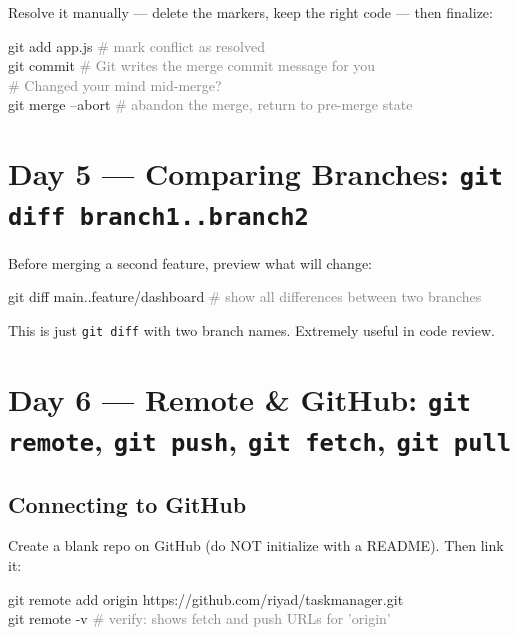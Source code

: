 \documentclass[10pt,a4paper]{article}
\newenvironment{codebox}{%
  \begin{mdframed}[backgroundcolor=codebg, linewidth=0pt,
    innerleftmargin=6pt, innerrightmargin=6pt,
    innertopmargin=4pt, innerbottommargin=4pt]%
  \small\ttfamily
}{%
  \end{mdframed}%
}
\newcommand{\cmd}[1]{\texttt{\small #1}}
\begin{document}
Resolve it manually --- delete the markers, keep the right code ---
then finalize:

\begin{codebox}
git add app.js              \textcolor{gray}{\# mark conflict as resolved}\\
git commit                  \textcolor{gray}{\# Git writes the merge commit message for you}\\
\textcolor{gray}{\# Changed your mind mid-merge?}\\
git merge --abort           \textcolor{gray}{\# abandon the merge, return to pre-merge state}
\end{codebox}

\section{Day 5 --- Comparing Branches: \texttt{git diff branch1..branch2}}

Before merging a second feature, preview what will change:

\begin{codebox}
git diff main..feature/dashboard    \textcolor{gray}{\# show all differences between two branches}
\end{codebox}

This is just \cmd{git diff} with two branch names. Extremely useful in code review.

\section{Day 6 --- Remote \& GitHub: \texttt{git remote}, \texttt{git push}, \texttt{git fetch}, \texttt{git pull}}

\subsection{Connecting to GitHub}

Create a blank repo on GitHub (do NOT initialize with a README). Then link it:

\begin{codebox}
git remote add origin https://github.com/riyad/taskmanager.git\\
git remote -v           \textcolor{gray}{\# verify: shows fetch and push URLs for 'origin'}
\end{codebox}
\end{document}
